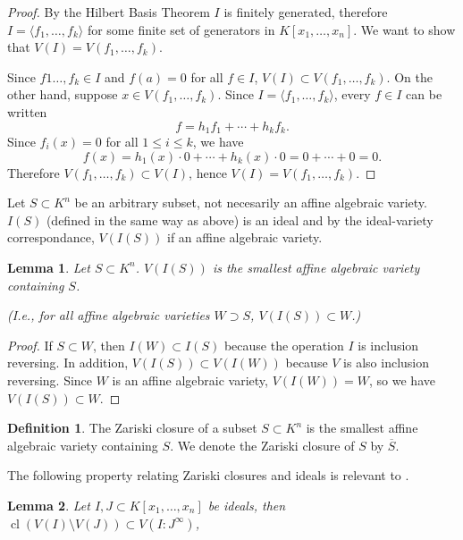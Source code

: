 \documentclass[
]{book}
\newtheorem{lemma}{Lemma}[chapter]
\theoremstyle{definition}
\newtheorem{definition}{Definition}[chapter]
\theoremstyle{definition}
\theoremstyle{definition}
\theoremstyle{definition}
\theoremstyle{remark}
\begin{document}
\begin{proof}
By the Hilbert Basis Theorem \(I\) is finitely generated, therefore \(I = \langle f_1,\ldots, f_k \rangle\) for some finite set of generators in \(K[x_1,\ldots,x_n]\). We want to show that \(V(I) = V(f_1,\ldots,f_k)\).

Since \(f1 \ldots,f_k \in I\) and \(f(a) = 0\) for all \(f\in I\), \(V(I) \subset V(f_1,\ldots,f_k)\).
On the other hand, suppose \(x \in V(f_1,\ldots,f_k)\). Since \(I = \langle f_1,\ldots,f_k \rangle\), every \(f \in I\) can be written
\[
f = h_1f_1 + \cdots + h_kf_k.
\]
Since \(f_i(x) = 0\) for all \(1 \le i \le k\), we have
\[
f(x) = h_1(x) \cdot 0 + \cdots + h_k(x) \cdot 0 = 0 + \cdots + 0 = 0.
\]
Therefore \(V(f_1,\ldots,f_k) \subset V(I)\), hence \(V(I) = V(f_1,\ldots,f_k)\).
\end{proof}

Let \(S \subset K^n\) be an arbitrary subset, not necesarily an affine algebraic variety. \(I(S)\) (defined in the same way as above) is an ideal and by the ideal-variety correspondance, \(V(I(S))\) if an affine algebraic variety.

\begin{lemma}
Let \(S \subset K^n\). \(V(I(S))\) is the smallest affine algebraic variety containing \(S\).

(I.e., for all affine algebraic varieties \(W \supset S\), \(V(I(S)) \subset W\).)
\end{lemma}

\begin{proof}
If \(S \subset W\), then \(I(W) \subset I(S)\) because the operation \(I\) is inclusion reversing.
In addition, \(V(I(S)) \subset V(I(W))\) because \(V\) is also inclusion reversing.
Since \(W\) is an affine algebraic variety, \(V(I(W)) = W\), so we have \(V(I(S)) \subset W\).
\end{proof}

\begin{definition}
The Zariski closure of a subset \(S \subset K^n\) is the smallest affine algebraic variety containing \(S\). We denote the Zariski closure of \(S\) by \(\overline{S}\).
\end{definition}

The following property relating Zariski closures and ideals is relevant to \citep[Proposition 5.14]{lazard10}.

\begin{lemma}
\citep[ p203, part of Theorem 10]{cox2013}
Let \(I,J \subset K[x_1,\ldots,x_n]\) be ideals, then
\({\operatorname{cl} \left(  V(I) \setminus V(J)  \right)} \subset V(I : J^\infty)\),
\end{lemma}
\end{document}
